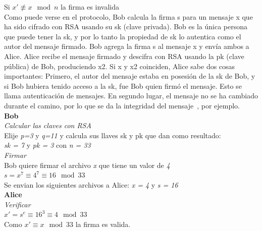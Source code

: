 Si \textit{$ x ' \not\equiv x \mod n$} la firma es invalida\\ 

Como puede verse en el protocolo, Bob calcula la firma s para un mensaje x que ha sido cifrado con RSA usando su sk (clave privada). Bob es la única persona que puede tener la sk, y por lo tanto la propiedad de sk lo autentica como el autor del mensaje firmado. Bob agrega la firma s al mensaje x y envía ambos a Alice. Alice recibe el mensaje firmado y descifra con RSA usando la pk (clave pública) de Bob, produciendo x2. Si x y x2 coinciden, Alice sabe dos cosas importantes: Primero, el autor del mensaje estaba en posesión de la sk de Bob, y si Bob hubiera tenido acceso a la sk, fue Bob quien firmó el mensaje. Esto se llama autenticación de mensajes. En segundo lugar, el mensaje no se ha cambiado durante el camino, por lo que se da la integridad del mensaje~\cite{paar}, por ejemplo.\\

\textbf{Bob}\\
\textit{Calcular las claves con RSA} \\

Elije \textit{ p=3 } y\textit{ q=11 } y calcula sus llaves sk y pk que dan como resultado: \\

\textit{ sk = 7 } y \textit{ pk = 3 } con \textit{ n = 33 } \\

\textit{Firmar} \\

Bob quiere firmar el archivo  \textit{ x } que tiene un valor de \textit{ 4 }\\

\textit{$ s =  x^{7} \equiv 4^{7} \equiv 16 \mod 33 $}\\

Se envian los siguientes archivos a Alice: \textit{ x = 4 } y \textit{ s = 16 } \\

\textbf{Alice}\\
\textit{Verificar} \\

\textit{$ x ' =  s^{e} \equiv 16^{3} \equiv 4 \mod 33 $}\\

Como \textit{$ x ' \equiv x \mod 33 $} la firma es valida.\\



